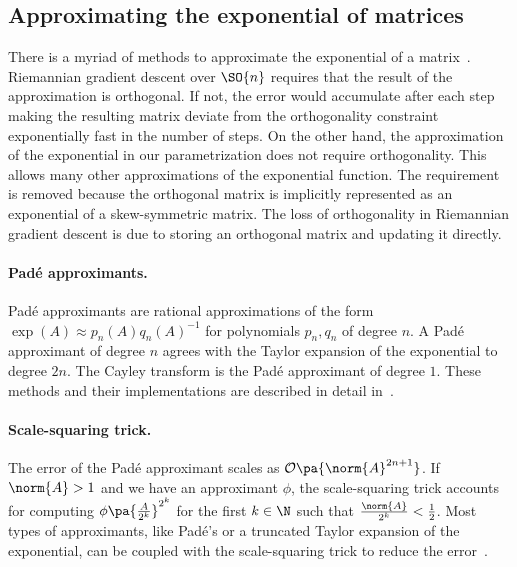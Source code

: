 \subsection{Approximating the exponential of matrices}\label{sec:approximations}
There is a myriad of methods to approximate the exponential of a matrix~\cite{moler2003nineteen}. Riemannian gradient descent over $\SO{n}$ requires that the result of the approximation is orthogonal. If not, the error would accumulate after each step making the resulting matrix deviate from the orthogonality constraint exponentially fast in the number of steps. On the other hand, the approximation of the exponential in our parametrization does not require orthogonality. This allows many other approximations of the exponential function. The requirement is removed because the orthogonal matrix is implicitly represented as an exponential of a skew-symmetric matrix. The loss of orthogonality in Riemannian gradient descent is due to storing an orthogonal matrix and updating it directly.

\paragraph{Pad\'e approximants.}
Pad\'e approximants are rational approximations of the form $\exp(A) \approx p_n(A)q_n(A)^{-1}$ for polynomials $p_n, q_n$ of degree $n$. A Pad\'e approximant of degree $n$ agrees with the Taylor expansion of the exponential to degree $2n$. The Cayley transform is the Pad\'e approximant of degree $1$. These methods and their implementations are described in detail in~\cite{higham2009scaling}.

\paragraph{Scale-squaring trick.} The error of the Pad\'e approximant scales as $\mathcal{O}\pa{\norm{A}^{2n+1}}$. If $\norm{A} > 1$ and we have an approximant $\phi$, the scale-squaring trick accounts for computing $\phi\pa{\frac{A}{2^k}}^{2^k}$ for the first $k\in\N$ such that $\frac{\norm{A}}{2^k} < \frac{1}{2}$.
Most types of approximants, like Pad\'e's or a truncated Taylor expansion of the exponential, can be coupled with the scale-squaring trick to reduce the error~\cite{higham2009scaling}.

